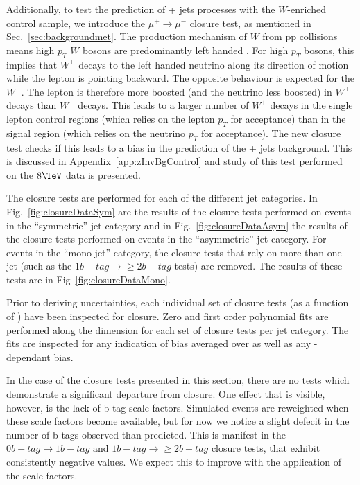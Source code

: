 Additionally, to test the prediction of \znunu + jets processes with
the $W$-enriched \mj control sample, we introduce the
$\mu^{+}\rightarrow\mu^{-}$ closure test, as mentioned in
Sec.~\ref{sec:backgroundmet}. The production mechanism of $W$ from pp collisions means
high $p_T$ $W$ bosons are predominantly left handed \cite{WPol}.  
For high $p_T$ bosons, this implies that $W^+$ decays 
to the left handed neutrino along its direction of motion while 
the lepton is pointing backward. The opposite behaviour is
expected for the $W^-$. The lepton is therefore more boosted (and
the neutrino less boosted) in $W^+$ decays than $W^-$ decays.  This
leads to a larger number of $W^+$ decays in the single lepton control
regions (which relies on the lepton $p_T$ for acceptance) than in the
signal region (which relies on the neutrino $p_T$ for acceptance). The
new closure test checks if this leads to a bias in the prediction of the 
\znunu + jets background. This is discussed in
Appendix~\ref{app:zInvBgControl} and study of this test performed on the
$8\tev$ data is presented.


The closure tests are performed for each of the different jet
categories. In Fig.~\ref{fig:closureDataSym} are the results of the
closure tests performed on events in the ``symmetric'' jet category
and in Fig.~\ref{fig:closureDataAsym} the results of the closure tests
performed on events in the ``asymmetric'' jet
category. For events in the ``mono-jet'' category, the closure tests
that rely on more than one jet (such as the $1 b-tag\rightarrow\geq 2
b-tag$ tests) are removed. The results of these tests are in
Fig~\ref{fig:closureDataMono}.

Prior to deriving uncertainties, each individual set of closure tests
(as a function of \scalht) have been inspected for closure. Zero and first order
polynomial fits are performed along the \scalht dimension for each set
of closure tests per jet category. The fits are inspected for any
indication of bias averaged over \scalht as well as any
\scalht-dependant bias.

In the case of the closure tests presented in this section, there are
no tests which demonstrate a significant departure from closure. One
effect that is visible, however, is the lack of b-tag scale factors.
Simulated events are reweighted when these scale factors become
available, but for now we notice a slight defecit in the number of
b-tags observed than predicted. This is manifest in the $0 b-tag
\rightarrow 1 b-tag$ and $1 b-tag \rightarrow \geq 2 b-tag$ closure
tests, that exhibit consistently negative values. We expect this to
improve with the application of the scale factors. 

